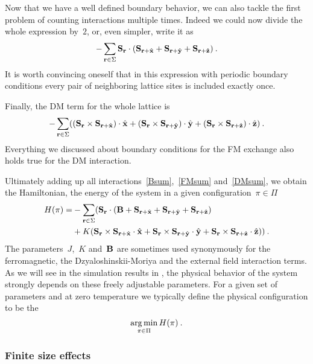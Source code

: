 Now that we have a well defined boundary behavior, we can also tackle the first
problem of counting interactions multiple times. Indeed we could now divide the
whole expression by~$2$, or, even simpler, write it as
%
\begin{equation}\label{FMsum}
  -\sum_{\mathbf{r} \in \Sigma} \mathbf{S}_{\mathbf{r}} \cdot
    (\mathbf{S}_{\mathbf{r} + \hat{\mathbf{x}}} + \mathbf{S}_{\mathbf{r} + \hat{\mathbf{y}}} + \mathbf{S}_{\mathbf{r} + \hat{\mathbf{z}}})\:.
\end{equation}
%
It is worth convincing oneself that in this expression with periodic boundary
conditions every pair of neighboring lattice sites is included exactly once.

Finally, the DM term for the whole lattice is
%
\begin{equation}\label{DMsum}
  -\sum_{\mathbf{r} \in \Sigma} ((\mathbf{S}_{\mathbf{r}} \times \mathbf{S}_{\mathbf{r} + \hat{\mathbf{x}}}) \cdot \hat{\mathbf{x}} +
    (\mathbf{S}_{\mathbf{r}} \times \mathbf{S}_{\mathbf{r} + \hat{\mathbf{y}}}) \cdot \hat{\mathbf{y}} +
    (\mathbf{S}_{\mathbf{r}} \times \mathbf{S}_{\mathbf{r} + \hat{\mathbf{z}}}) \cdot \hat{\mathbf{z}})\:.
\end{equation}
%
Everything we discussed about boundary conditions for the FM exchange also holds
true for the DM interaction.

Ultimately adding up all interactions~\eqref{Bsum},~\eqref{FMsum}
and~\eqref{DMsum}, we obtain the Hamiltonian, \ie{} the energy of the system in
a given configuration~$\pi \in \Pi$
%
\begin{align}\label{hamiltonian}
  H(\pi) = &-\sum_{\mathbf{r} \in \Sigma} (\mathbf{S}_{\mathbf{r}} \cdot
          (\mathbf{B} + \mathbf{S}_{\mathbf{r}+\hat{\mathbf{x}}} + \mathbf{S}_{\mathbf{r}+\hat{\mathbf{y}}} + \mathbf{S}_{\mathbf{r}+\hat{\mathbf{z}}}) \\
      &+ K (\mathbf{S}_{\mathbf{r}} \times \mathbf{S}_{\mathbf{r}+\hat{\mathbf{x}}} \cdot \hat{\mathbf{x}} +
            \mathbf{S}_{\mathbf{r}} \times \mathbf{S}_{\mathbf{r}+\hat{\mathbf{y}}} \cdot \hat{\mathbf{y}} +
            \mathbf{S}_{\mathbf{r}} \times \mathbf{S}_{\mathbf{r}+\hat{\mathbf{z}}} \cdot \hat{\mathbf{z}}))\:.
\end{align}
%
The parameters~$J$,~$K$ and~$\mathbf{B}$ are sometimes used synonymously for the
ferromagnetic, the Dzyaloshinskii-Moriya and the external field interaction
terms. As we will see in the simulation results in , the
physical behavior of the system strongly depends on these freely adjustable
parameters. For a given set of parameters and at zero temperature we typically
define the physical configuration to be the
%
\begin{equation}\label{objective}
  \operatorname*{arg\,min}_{\pi \in \Pi} H(\pi)\:.
\end{equation}

\subsubsection{Finite size effects}


